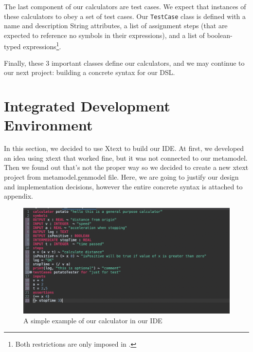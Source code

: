 \documentclass[11pt,fleqn]{article}
\begin{document}
The last component of our calculators are test cases. We expect that instances
of these calculators to obey a set of test cases. Our \lstinline{TestCase} class
is defined with a name and description String attributes, a list of assignment
steps (that are expected to reference no symbols in their expressions), and a
list of boolean-typed expressions\footnote{Both restrictions are only imposed in
.}.

Finally, these 3 important classes define our calculators, and we may continue
to our next project: building a concrete syntax for our DSL.

\newpage{}

\section{Integrated Development Environment}
\label{sec:integrated-development-environment}
In this section, we decided to use Xtext to build our IDE. At first, we developed an idea 
using xtext that worked fine, but it was not connected to our metamodel. 
Then we found out that's not the proper way so we decided to create a new xtext project from metamodel.genmodel file. Here, we are going to justify our design and 
 implementation decisions, however the entire concrete syntax is attached to appendix.
 
   \begin{figure}[h]
    \centering
    \includegraphics[width=1\textwidth]{ide1.png}
    \caption{A simple example of our calculator in our IDE}
    \label{fig:ide1}
\end{figure}
\end{document}
